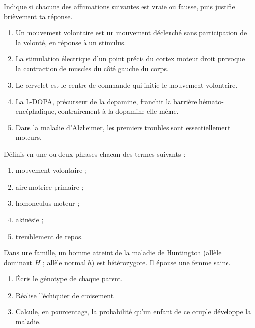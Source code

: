 \documentclass[11pt]{article}
\newcounter{popsec}
\newcounter{popsub}
\newcommand{\courssub}[1]{%
  \stepcounter{popsub}%
  \par\vspace{9pt}\noindent{\popxbold\fontsize{11.5}{13}\selectfont\color{popink}{\color{poporange}\thepopsec.\thepopsub}\hspace{6pt}#1}\par\nopagebreak\vspace{4pt}
}
\begin{document}
\begin{exercice}
Indique si chacune des affirmations suivantes est vraie ou fausse, puis justifie brièvement ta réponse.
\begin{enumerate}
\item Un mouvement volontaire est un mouvement déclenché sans participation de la volonté, en réponse à un stimulus.
\item La stimulation électrique d'un point précis du cortex moteur droit provoque la contraction de muscles du côté gauche du corps.
\item Le cervelet est le centre de commande qui initie le mouvement volontaire.
\item La L-DOPA, précurseur de la dopamine, franchit la barrière hémato-encéphalique, contrairement à la dopamine elle-même.
\item Dans la maladie d'Alzheimer, les premiers troubles sont essentiellement moteurs.
\end{enumerate}
\end{exercice}

\begin{exercice}[Définitions]
Définis en une ou deux phrases chacun des termes suivants :
\begin{enumerate}
\item mouvement volontaire ;
\item aire motrice primaire ;
\item homonculus moteur ;
\item akinésie ;
\item tremblement de repos.
\end{enumerate}
\end{exercice}

\begin{exercice}
Dans une famille, un homme atteint de la maladie de Huntington (allèle dominant $H$ ; allèle normal $h$) est hétérozygote. Il épouse une femme saine.
\begin{enumerate}
\item Écris le génotype de chaque parent.
\item Réalise l'échiquier de croisement.
\item Calcule, en pourcentage, la probabilité qu'un enfant de ce couple développe la maladie.
\end{enumerate}
\end{exercice}

\courssub{Je m'entraîne}
\end{document}
